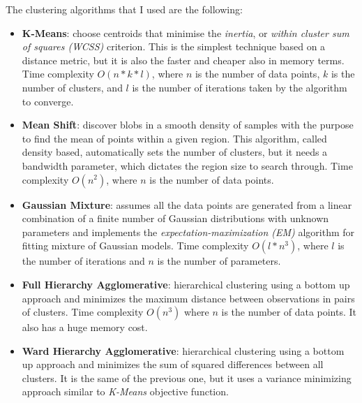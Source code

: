 The clustering algorithms that I used are the following: 
\begin{itemize}
	\item \textbf{K-Means}: choose centroids that minimise the \textit{inertia}, or \textit{within cluster sum of squares (WCSS)} criterion. This is the simplest technique based on a distance metric, but it is also the faster and cheaper also in memory terms. Time complexity $O(n*k*l)$, where $n$ is the number of data points, $k$ is the number of clusters, and $l$ is the number of iterations taken by the algorithm to converge.
	\item \textbf{Mean Shift}: discover blobs in a smooth density of samples with the purpose to find the mean of points within a given region. This algorithm, called density based, automatically sets the number of clusters, but it needs a bandwidth parameter, which dictates the region size to search through. Time complexity $O(n ^ 2)$, where $n$ is the number of data points.
	\item \textbf{Gaussian Mixture}:  assumes all the data points are generated from a linear combination of a finite number of Gaussian distributions with unknown parameters and implements the \textit{expectation-maximization (EM)} algorithm for fitting mixture of Gaussian models. Time complexity $O(l * n ^ 3)$, where $l$ is the number of iterations and $n$ is the number of parameters. 
	\item \textbf{Full Hierarchy Agglomerative}: hierarchical clustering using a bottom up approach and minimizes the maximum distance between observations in pairs of clusters. Time complexity $O(n ^ 3)$ where $n$ is the number of data points. It also has a huge memory cost.
	\item \textbf{Ward Hierarchy Agglomerative}: hierarchical clustering using a bottom up approach and minimizes the sum of squared differences between all clusters. It is the same of the previous one, but it uses a variance minimizing approach similar to \textit{K-Means} objective function.
\end{itemize}